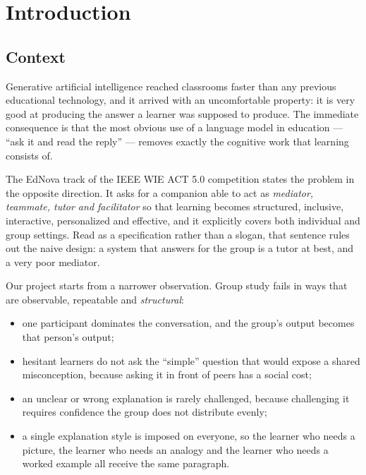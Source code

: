 \chapter{Introduction}
\label{ch:intro}

\section{Context}

Generative artificial intelligence reached classrooms faster than any previous
educational technology, and it arrived with an uncomfortable property: it is very good
at producing the answer a learner was supposed to produce. The immediate consequence is
that the most obvious use of a language model in education --- ``ask it and read the
reply'' --- removes exactly the cognitive work that learning consists of.

The EdNova track of the IEEE WIE ACT 5.0 competition states the problem in the opposite
direction. It asks for a companion able to act as \emph{mediator, teammate, tutor and
facilitator} so that learning becomes structured, inclusive, interactive, personalized
and effective, and it explicitly covers both individual and group settings. Read as a
specification rather than a slogan, that sentence rules out the naive design: a system
that answers for the group is a tutor at best, and a very poor mediator.

Our project starts from a narrower observation. Group study fails in ways that are
observable, repeatable and \emph{structural}:

\begin{itemize}[leftmargin=1.4em,itemsep=2pt]
  \item one participant dominates the conversation, and the group's output becomes that
        person's output;
  \item hesitant learners do not ask the ``simple'' question that would expose a shared
        misconception, because asking it in front of peers has a social cost;
  \item an unclear or wrong explanation is rarely challenged, because challenging it
        requires confidence the group does not distribute evenly;
  \item a single explanation style is imposed on everyone, so the learner who needs a
        picture, the learner who needs an analogy and the learner who needs a worked
        example all receive the same paragraph.
\end{itemize}

